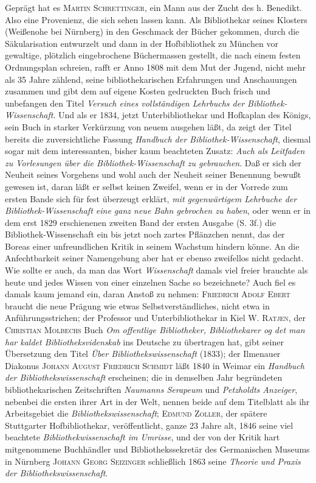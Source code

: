 \documentclass[a4paper,
fontsize=11pt,
oneside,
numbers=noperiodatend,
parskip=half-,
bibliography=totoc,
final
]{scrartcl}
\begin{document}
Geprägt hat es \textsc{Martin Schrettinger}, ein Mann aus der Zucht des
h. Benedikt. Also eine Provenienz, die sich sehen lassen kann. Als
Bibliothekar seines Klosters (Weißenohe bei Nürnberg) in den Geschmack
der Bücher gekommen, durch die Säkularisation entwurzelt und dann in der
Hofbibliothek zu München vor gewaltige, plötzlich eingebrochene
Büchermassen gestellt, die nach einem festen Ordnungsplan schreien,
rafft er Anno 1808 mit dem Mut der Jugend, nicht mehr als 35 Jahre
zählend, seine bibliothekarischen Erfahrungen und Anschauungen zusammen
und gibt dem auf eigene Kosten gedruckten Buch frisch und unbefangen den
Titel \emph{Versuch eines vollständigen Lehrbuchs der
Bibliothek-Wissenschaft}. Und als er 1834, jetzt Unterbibliothekar und
Hofkaplan des Königs, sein Buch in starker Verkürzung von neuem ausgehen
läßt, da zeigt der Titel bereits die zuversichtliche Fassung
\emph{Handbuch der Bibliothek-Wissenschaft}, diesmal sogar mit dem
interessanten, bisher kaum beachteten Zusatz: \emph{Auch als}
\emph{Leitfaden zu Vorlesungen über die Bibliothek-Wissenschaft zu
gebrauchen}. Daß er sich der Neuheit seines Vorgehens und wohl auch der
Neuheit seiner Benennung bewußt gewesen ist, daran läßt er selbst keinen
Zweifel, wenn er in der Vorrede zum ersten Bande sich für fest überzeugt
erklärt, \emph{mit gegenwärtigem Lehrbuche der}
\emph{Bibliothek-Wissenschaft eine ganz neue Bahn gebrochen zu haben},
oder wenn er in dem erst 1829 erschienenen zweiten Band der ersten
Ausgabe (S. 3f.) die Bibliothek-Wissenschaft ein bis jetzt noch zartes
Pflänzchen nennt, das der Boreas einer unfreundlichen Kritik in seinem
Wachstum hindern könne. An die Anfechtbarkeit seiner Namengebung aber
hat er ebenso zweifellos nicht gedacht. Wie sollte er auch, da man das
Wort \emph{Wissenschaft} damals viel freier brauchte als heute und jedes
Wissen von einer einzelnen Sache so bezeichnete? Auch fiel es damals
kaum jemand ein, daran Anstoß zu nehmen: \textsc{Friedrich Adolf Ebert}
braucht die neue Prägung wie etwas Selbstverständliches, nicht etwa in
Anführungsstrichen; der Professor und Unterbibliothekar in Kiel
\textsc{W. Ratjen}, der \textsc{Christian Molbechs} Buch \emph{Om
offentlige Bibliotheker, Bibliothekarer og det man} \emph{har kaldet
Bibliotheksvidenskab} ins Deutsche zu übertragen hat, gibt seiner
Übersetzung den Titel \emph{Über Bibliothekswissenschaft} (1833); der
Ilmenauer Diakonus \textsc{Johann August Friedrich Schmidt} läßt 1840 in
Weimar ein \emph{Handbuch der Bibliothekswissenschaft} erscheinen; die
in demselben Jahr begründeten bibliothekarischen Zeitschriften
\emph{Naumanns Serapeum} und \emph{Petzholdts Anzeiger}, nebenbei die
ersten ihrer Art in der Welt, nennen beide auf dem Titelblatt als ihr
Arbeitsgebiet die \emph{Bibliothekswissenschaft}; \textsc{Edmund
Zoller}, der spätere Stuttgarter Hofbibliothekar, veröffentlicht, ganze
23 Jahre alt, 1846 seine viel beachtete \emph{Bibliothekwissenschaft im
Umrisse}, und der von der Kritik hart mitgenommene Buchhändler und
Bibliothekssekretär des Germanischen Museums in Nürnberg \textsc{Johann
Georg} \textsc{Seizinger} schließlich 1863 seine \emph{Theorie und
Praxis der Bibliothekswissenschaft}.
\end{document}
